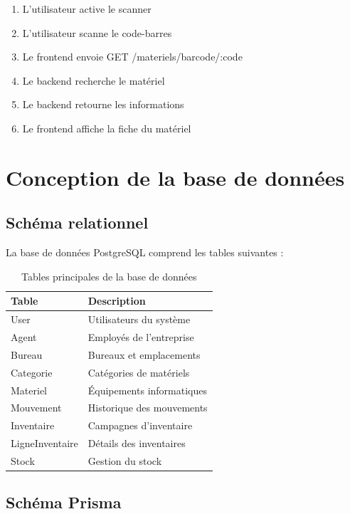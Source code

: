 \documentclass[12pt,a4paper]{report}
\begin{document}
\begin{enumerate}
    \item L'utilisateur active le scanner
    \item L'utilisateur scanne le code-barres
    \item Le frontend envoie GET /materiels/barcode/:code
    \item Le backend recherche le matériel
    \item Le backend retourne les informations
    \item Le frontend affiche la fiche du matériel
\end{enumerate}

\section{Conception de la base de données}

\subsection{Schéma relationnel}

La base de données PostgreSQL comprend les tables suivantes :

\begin{table}[H]
\centering
\caption{Tables principales de la base de données}
\begin{tabularx}{\textwidth}{|l|X|}
\hline
\textbf{Table} & \textbf{Description} \\
\hline
User & Utilisateurs du système \\
\hline
Agent & Employés de l'entreprise \\
\hline
Bureau & Bureaux et emplacements \\
\hline
Categorie & Catégories de matériels \\
\hline
Materiel & Équipements informatiques \\
\hline
Mouvement & Historique des mouvements \\
\hline
Inventaire & Campagnes d'inventaire \\
\hline
LigneInventaire & Détails des inventaires \\
\hline
Stock & Gestion du stock \\
\hline
\end{tabularx}
\end{table}

\subsection{Schéma Prisma}
\end{document}

